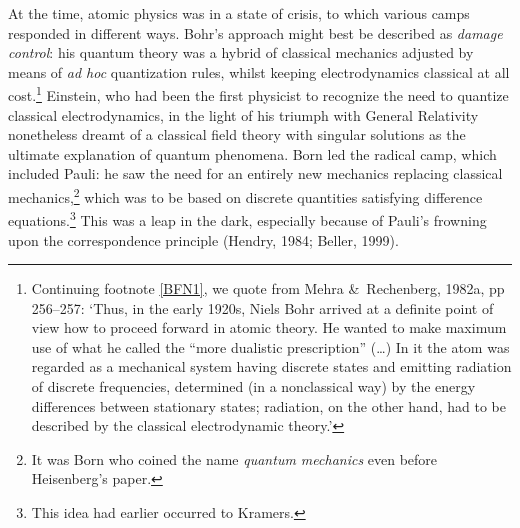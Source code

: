 \documentclass[12pt]{article}
\begin{document}
At the time, atomic physics was in a state of crisis, to which various camps 
responded in  different ways. Bohr's approach might best be described as \textit{damage control}: his quantum theory was a hybrid of classical mechanics adjusted by means of \textit{ad hoc} quantization rules, whilst keeping  electrodynamics classical at all cost.\footnote{\label{Bohropp} 
Continuing footnote \ref{BFN1}, we quote from 
 Mehra \&\ Rechenberg, 1982a, pp 256--257: `Thus, in the early 1920s, Niels Bohr arrived at a definite point of view how to proceed forward in atomic theory. He wanted to make maximum use of what he called the ``more dualistic prescription'' (\ldots) In it the atom was regarded as a mechanical system having discrete states and emitting radiation of discrete frequencies, determined (in a nonclassical way) by the energy differences between stationary states; radiation, on the other hand, had to be described by the classical electrodynamic theory.'}    Einstein, who had been  the first physicist to recognize the need to quantize classical electrodynamics, in the light of his triumph with General Relativity  nonetheless dreamt of a classical field theory with singular solutions as the ultimate explanation of quantum phenomena. Born led the radical camp, which included Pauli: he saw the need for an entirely new mechanics replacing classical mechanics,\footnote{It was Born who coined the name \textit{quantum mechanics} even before Heisenberg's paper.} which was to be based on discrete quantities satisfying difference equations.\footnote{This idea had earlier occurred to Kramers.}  This was a leap in the dark, especially because of Pauli's frowning upon the correspondence principle (Hendry, 1984; Beller, 1999). 
\end{document}
